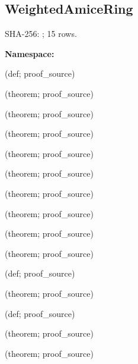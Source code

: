 \subsection*{WeightedAmiceRing}
{\footnotesize SHA-256: ; 15 rows.}\par
\begingroup\small
\textbf{Namespace:} \par
\noindent{} {\scriptsize (def; proof\_source)}\par
\noindent{} {\scriptsize (theorem; proof\_source)}\par
\noindent{} {\scriptsize (theorem; proof\_source)}\par
\noindent{} {\scriptsize (theorem; proof\_source)}\par
\noindent{} {\scriptsize (theorem; proof\_source)}\par
\noindent{} {\scriptsize (theorem; proof\_source)}\par
\noindent{} {\scriptsize (theorem; proof\_source)}\par
\noindent{} {\scriptsize (theorem; proof\_source)}\par
\noindent{} {\scriptsize (theorem; proof\_source)}\par
\noindent{} {\scriptsize (theorem; proof\_source)}\par
\noindent{} {\scriptsize (def; proof\_source)}\par
\noindent{} {\scriptsize (theorem; proof\_source)}\par
\noindent{} {\scriptsize (def; proof\_source)}\par
\noindent{} {\scriptsize (theorem; proof\_source)}\par
\noindent{} {\scriptsize (theorem; proof\_source)}\par
\endgroup
